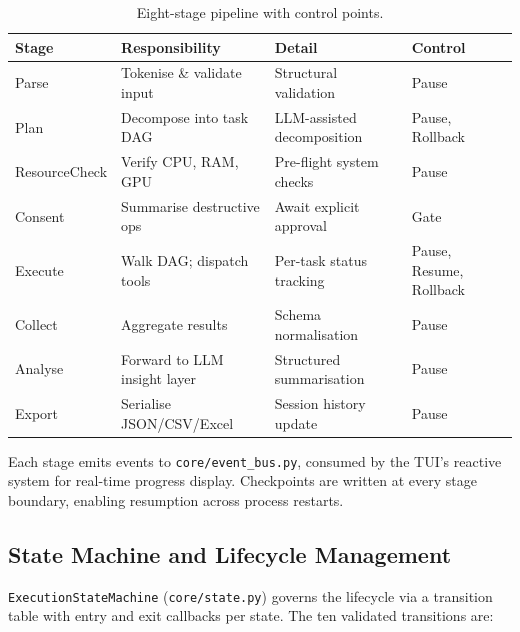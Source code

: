\documentclass[11pt,a4paper]{article}
\begin{document}
\begin{table}[!h]
\centering
\footnotesize
\renewcommand{\arraystretch}{1.2}
\caption{Eight-stage pipeline with control points.}
\label{tab:proxima-pipeline}
\begin{tabular}{@{}lp{4.0cm}p{5.3cm}l@{}}
\toprule
\textbf{Stage} & \textbf{Responsibility} & \textbf{Detail} & \textbf{Control} \\
\midrule
Parse         & Tokenise \& validate input       & Structural validation          & Pause \\
Plan          & Decompose into task DAG          & LLM-assisted decomposition     & Pause, Rollback \\
ResourceCheck & Verify CPU, RAM, GPU             & Pre-flight system checks       & Pause \\
Consent       & Summarise destructive ops        & Await explicit approval        & Gate \\
Execute       & Walk DAG; dispatch tools         & Per-task status tracking       & Pause, Resume, Rollback \\
Collect       & Aggregate results                & Schema normalisation           & Pause \\
Analyse       & Forward to LLM insight layer     & Structured summarisation       & Pause \\
Export        & Serialise JSON/CSV/Excel         & Session history update         & Pause \\
\bottomrule
\end{tabular}
\end{table}

Each stage emits events to \texttt{core/event\_bus.py}, consumed by the TUI's
reactive system for real-time progress display. Checkpoints are written at every
stage boundary, enabling resumption across process restarts.

\subsection{State Machine and Lifecycle Management}

\texttt{ExecutionStateMachine} (\texttt{core/state.py}) governs the lifecycle via
a transition table with entry and exit callbacks per state. The ten validated
transitions are:
\end{document}
